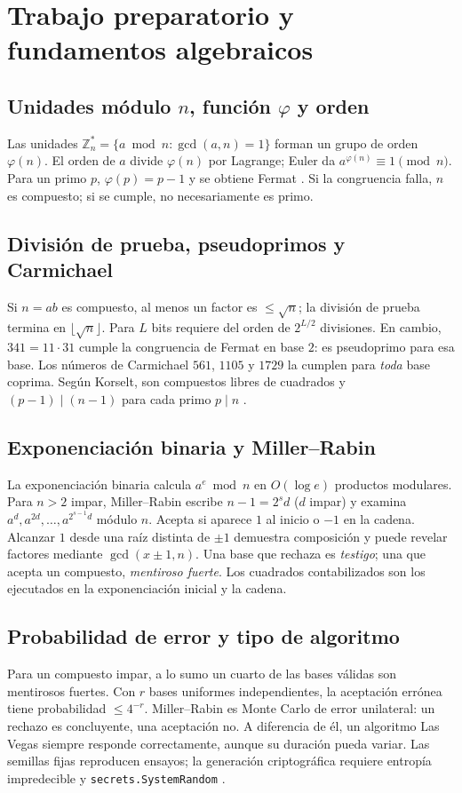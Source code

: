 \section{Trabajo preparatorio y fundamentos algebraicos}

\subsection{Unidades módulo \texorpdfstring{$n$}{n}, función \texorpdfstring{$\varphi$}{phi} y orden}
Las unidades $\mathbb{Z}_n^{*}=\{a\bmod n:\gcd(a,n)=1\}$ forman un grupo de orden $\varphi(n)$. El orden de $a$ divide $\varphi(n)$ por Lagrange; Euler da $a^{\varphi(n)}\equiv1\pmod n$. Para un primo $p$, $\varphi(p)=p-1$ y se obtiene Fermat \cite{shoup,cormen}. Si la congruencia falla, $n$ es compuesto; si se cumple, no necesariamente es primo.

\subsection{División de prueba, pseudoprimos y Carmichael}
Si $n=ab$ es compuesto, al menos un factor es $\le\sqrt n$; la división de prueba termina en $\lfloor\sqrt n\rfloor$. Para $L$ bits requiere del orden de $2^{L/2}$ divisiones. En cambio, $341=11\cdot31$ cumple la congruencia de Fermat en base $2$: es pseudoprimo para esa base. Los números de Carmichael $561$, $1105$ y $1729$ la cumplen para \emph{toda} base coprima. Según Korselt, son compuestos libres de cuadrados y $(p-1)\mid(n-1)$ para cada primo $p\mid n$ \cite{crandall}.

\subsection{Exponenciación binaria y Miller--Rabin}
La exponenciación binaria calcula $a^e\bmod n$ en $O(\log e)$ productos modulares. Para $n>2$ impar, Miller--Rabin escribe $n-1=2^sd$ ($d$ impar) y examina $a^d,a^{2d},\ldots,a^{2^{s-1}d}$ módulo $n$. Acepta si aparece $1$ al inicio o $-1$ en la cadena. Alcanzar $1$ desde una raíz distinta de $\pm1$ demuestra composición y puede revelar factores mediante $\gcd(x\pm1,n)$. Una base que rechaza es \emph{testigo}; una que acepta un compuesto, \emph{mentiroso fuerte}. Los cuadrados contabilizados son los ejecutados en la exponenciación inicial y la cadena.

\subsection{Probabilidad de error y tipo de algoritmo}
Para un compuesto impar, a lo sumo un cuarto de las bases válidas son mentirosos fuertes. Con $r$ bases uniformes independientes, la aceptación errónea tiene probabilidad $\le4^{-r}$. Miller--Rabin es Monte Carlo de error unilateral: un rechazo es concluyente, una aceptación no. A diferencia de él, un algoritmo Las Vegas siempre responde correctamente, aunque su duración pueda variar. Las semillas fijas reproducen ensayos; la generación criptográfica requiere entropía impredecible y \texttt{secrets.SystemRandom} \cite{pythonsecrets}.

